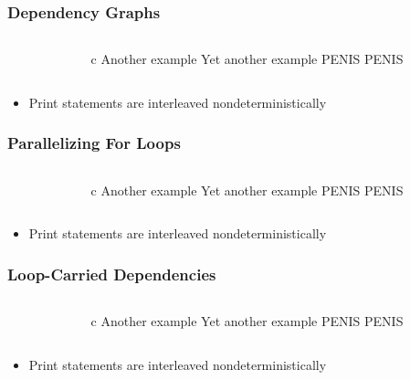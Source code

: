 \documentclass[handout]{beamer}
\begin{document}
\begin{frame}[fragile]
  \frametitle{Dependency Graphs}
  \begin{columns}[t]%
    \begin{column}{0.65\textwidth}
    \end{column}
    \pause
    \begin{column}{0.4\textwidth}
      \begin{ccode}[]
        {c}
        Another example
        Yet another example
        PENIS
        PENIS
      \end{ccode}
    \end{column}
  \end{columns}
  \pause
  \begin{itemize}
  \item Print statements are interleaved nondeterministically
  \end{itemize}
\end{frame}



\begin{frame}[fragile]
  \frametitle{Parallelizing For Loops}
  \begin{columns}[t]%
    \begin{column}{0.65\textwidth}
    \end{column}
    \pause
    \begin{column}{0.4\textwidth}
      \begin{ccode}[]
        {c}
        Another example
        Yet another example
        PENIS
        PENIS
      \end{ccode}
    \end{column}
  \end{columns}
  \pause
  \begin{itemize}
  \item Print statements are interleaved nondeterministically
  \end{itemize}
\end{frame}



\begin{frame}[fragile]
  \frametitle{Loop-Carried Dependencies}
  \begin{columns}[t]%
    \begin{column}{0.65\textwidth}
    \end{column}
    \pause
    \begin{column}{0.4\textwidth}
      \begin{ccode}[]
        {c}
        Another example
        Yet another example
        PENIS
        PENIS
      \end{ccode}
    \end{column}
  \end{columns}
  \pause
  \begin{itemize}
  \item Print statements are interleaved nondeterministically
  \end{itemize}
\end{frame}
\end{document}
